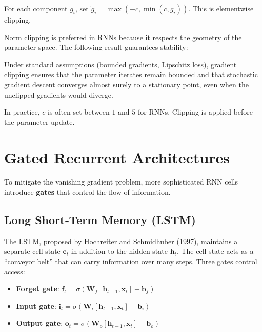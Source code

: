 \documentclass{tufte-handout}
\begin{document}
\begin{defn}
    For each component $g_i$, set $\tilde{g}_i = \max(-c, \min(c, g_i))$. This is elementwise clipping.
\end{defn}

Norm clipping is preferred in RNNs because it respects the geometry of the parameter space. The following result guarantees stability:

\begin{thm}
    Under standard assumptions (bounded gradients, Lipschitz loss), gradient clipping ensures that the parameter iterates remain bounded and that stochastic gradient descent converges almost surely to a stationary point, even when the unclipped gradients would diverge.
\end{thm}

In practice, $c$ is often set between $1$ and $5$ for RNNs. Clipping is applied before the parameter update.

\section{Gated Recurrent Architectures}

To mitigate the vanishing gradient problem, more sophisticated RNN cells introduce \textbf{gates} that control the flow of information.

\subsection{Long Short‑Term Memory (LSTM)}

The LSTM, proposed by Hochreiter and Schmidhuber (1997), maintains a separate cell state $\mathbf{c}_t$ in addition to the hidden state $\mathbf{h}_t$. The cell state acts as a “conveyor belt” that can carry information over many steps. Three gates control access:

\begin{itemize}
    \item \textbf{Forget gate}: $\mathbf{f}_t = \sigma(\mathbf{W}_f [\mathbf{h}_{t-1}, \mathbf{x}_t] + \mathbf{b}_f)$
    \item \textbf{Input gate}: $\mathbf{i}_t = \sigma(\mathbf{W}_i [\mathbf{h}_{t-1}, \mathbf{x}_t] + \mathbf{b}_i)$
    \item \textbf{Output gate}: $\mathbf{o}_t = \sigma(\mathbf{W}_o [\mathbf{h}_{t-1}, \mathbf{x}_t] + \mathbf{b}_o)$
\end{itemize}
\end{document}
